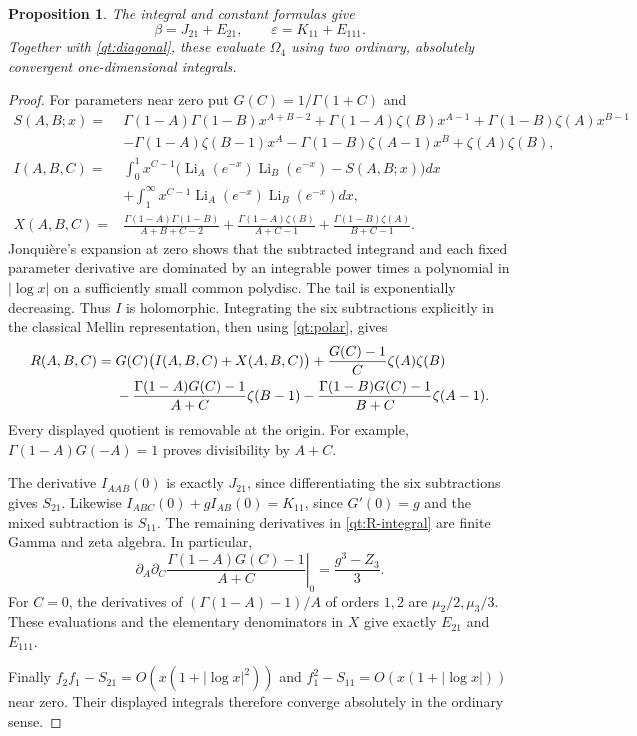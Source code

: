 \documentclass[11pt]{article}
\numberwithin{equation}{section}
\newtheorem{proposition}[theorem]{Proposition}
\theoremstyle{definition}
\theoremstyle{remark}
\begin{document}
\begin{proposition}\label{qt:integrals}
The integral and constant formulas give
\begin{equation}\label{qt:beta-epsilon}
 \boxed{\beta=J_{21}+E_{21},\qquad
        \varepsilon=K_{11}+E_{111}.}
\end{equation}
Together with \eqref{qt:diagonal}, these evaluate $\Omega_4$ using
two ordinary, absolutely convergent one-dimensional integrals.
\end{proposition}
\begin{proof}
For parameters near zero put $G(C)=1/\Gamma(1+C)$ and
\begin{align*}
 S(A,B;x)={}&\Gamma(1-A)\Gamma(1-B)x^{A+B-2}
 +\Gamma(1-A)\zeta(B)x^{A-1}
 +\Gamma(1-B)\zeta(A)x^{B-1}\\
 &-\Gamma(1-A)\zeta(B-1)x^A
 -\Gamma(1-B)\zeta(A-1)x^B+\zeta(A)\zeta(B),\\
 I(A,B,C)={}&\int_0^1x^{C-1}
  \bigl(\operatorname{Li}_A(e^{-x})\operatorname{Li}_B(e^{-x})-S(A,B;x)\bigr)dx\\
 &+\int_1^\infty x^{C-1}
                    \operatorname{Li}_A(e^{-x})\operatorname{Li}_B(e^{-x})dx,\\
 X(A,B,C)={}&\frac{\Gamma(1-A)\Gamma(1-B)}{A+B+C-2}
  +\frac{\Gamma(1-A)\zeta(B)}{A+C-1}
  +\frac{\Gamma(1-B)\zeta(A)}{B+C-1}.
\end{align*}
Jonqui\`ere's expansion at zero \cite[Eq.~25.12.12]{DLMFPolylog} shows that the subtracted integrand
and each fixed parameter derivative are dominated by an integrable
power times a polynomial in $|\log x|$ on a sufficiently small common
polydisc. The tail is exponentially decreasing. Thus $I$ is holomorphic.
Integrating the six subtractions explicitly in the classical Mellin
representation, then using \eqref{qt:polar}, gives
\begin{align}\label{qt:R-integral}
 R(A,B,C)={}&G(C)\bigl(I(A,B,C)+X(A,B,C)\bigr)
            +\frac{G(C)-1}{C}\zeta(A)\zeta(B)\notag\\
 &-\frac{\Gamma(1-A)G(C)-1}{A+C}\zeta(B-1)
  -\frac{\Gamma(1-B)G(C)-1}{B+C}\zeta(A-1).
\end{align}
Every displayed quotient is removable at the origin. For example,
$\Gamma(1-A)G(-A)=1$ proves divisibility by $A+C$.

The derivative $I_{AAB}(0)$ is exactly $J_{21}$, since differentiating
the six subtractions gives $S_{21}$. Likewise
$I_{ABC}(0)+gI_{AB}(0)=K_{11}$, since $G'(0)=g$ and the mixed
subtraction is $S_{11}$. The remaining derivatives in
\eqref{qt:R-integral} are finite Gamma and zeta algebra. In particular,
\[
 \left.\partial_A\partial_C
       \frac{\Gamma(1-A)G(C)-1}{A+C}\right|_0
       =\frac{g^3-Z_3}{3}.
\]
For $C=0$, the derivatives of
$(\Gamma(1-A)-1)/A$ of orders $1,2$ are $\mu_2/2,\mu_3/3$.
These evaluations and the elementary denominators in $X$ give exactly
$E_{21}$ and $E_{111}$.

Finally $f_2f_1-S_{21}=O(x(1+|\log x|^2))$ and
$f_1^2-S_{11}=O(x(1+|\log x|))$ near zero. Their displayed
integrals therefore converge absolutely in the ordinary sense.
\end{proof}
\end{document}
